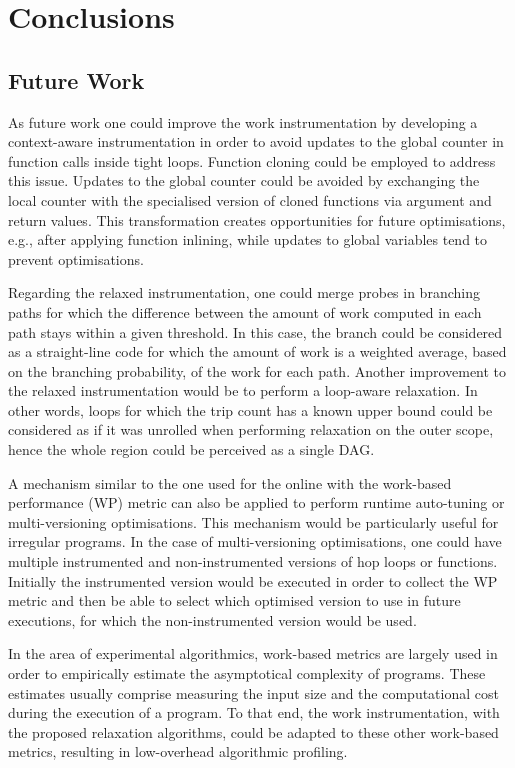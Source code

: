 \chapter{Conclusions}


\section{Future Work}

As future work one could improve the work instrumentation by developing a context-aware instrumentation in order to avoid updates to the global counter in function calls inside tight loops.
Function cloning could be employed to address this issue.
Updates to the global counter could be avoided by exchanging the local counter with the specialised version of cloned functions via argument and return values.
This transformation creates opportunities for future optimisations, e.g., after applying function inlining, while updates to global variables tend to prevent optimisations.

Regarding the relaxed instrumentation,
one could merge probes in branching paths for which the difference between the amount of work computed in each path stays within a given threshold.
In this case, the branch could be considered as a straight-line code for which the amount of work is a weighted average, based on the branching probability, of the work for each path.
Another improvement to the relaxed instrumentation would be to perform a loop-aware relaxation.
In other words, loops for which the trip count has a known upper bound could be considered as if it was unrolled when performing relaxation on the outer scope, hence the whole region could be perceived as a single DAG.

A mechanism similar to the one used for the online {\itercomp} with the work-based performance (WP) metric can also be applied to perform
runtime auto-tuning or multi-versioning optimisations.
This mechanism would be particularly useful for irregular programs.
In the case of multi-versioning optimisations, one could have multiple instrumented and non-instrumented versions of hop loops or functions.
Initially the instrumented version would be executed in order to collect the WP metric and then be able to select which optimised version to use in future executions, 
for which the non-instrumented version would be used.

In the area of experimental algorithmics, work-based metrics are largely used in order to empirically estimate the asymptotical complexity of programs.
These estimates usually comprise measuring the input size and the computational cost during the execution of a program.
To that end, the work instrumentation, with the proposed relaxation algorithms, could be adapted to these other work-based metrics, resulting in low-overhead algorithmic profiling.
